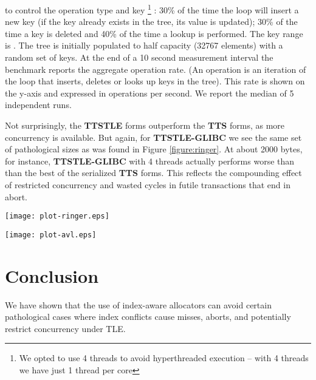 \documentclass[preprint]{sigplanconf}
\begin{document}
to control the operation type and key \footnote{We opted to use 4 threads to
avoid hyperthreaded execution --  with 4 threads we have just 1 thread per core} :
30\% of the time the loop will insert a new key (if the key
already exists in the tree, its value is updated); 30\% of the time a key is deleted
and 40\% of the time a lookup is performed.  The key range is .  The
tree is initially populated to half capacity (32767 elements) with a random set of keys.  At the 
end of a 10 second measurement interval the benchmark reports the aggregate
operation rate.  (An operation is an iteration of the loop that inserts, deletes
or looks up keys in the tree).  This rate is shown on the y-axis and expressed
in operations per second.   We report the median of 5 independent runs.  

Not surprisingly, the \textbf{TTSTLE} forms outperform the \textbf{TTS} forms, 
as more concurrency is available.  But again, for \textbf{TTSTLE-GLIBC} we
see the same set of pathological sizes as was found in Figure \ref{figure:ringer}. 
At about 2000 bytes, for instance, \textbf{TTSTLE-GLIBC} with 4 threads actually
performs worse than than the best of the serialized \textbf{TTS} forms.  
This reflects the compounding effect of restricted concurrency and wasted cycles
in futile transactions that end in abort. 


\begin{figure*}[hbtp]
\begin{center}
\texttt{[image: plot-ringer.eps]}
\end{center}
\caption{Single-threaded ring traversal rates} 
\label{figure:ringer}
\end{figure*}

\begin{figure*}[hbtp]
\begin{center}
\texttt{[image: plot-avl.eps]}
\end{center}
\caption{AVL tree throughput with 4 threads} 
\label{figure:avl} 
\end{figure*}


\section{Conclusion}

We have shown that the use of index-aware allocators can avoid certain
pathological cases where index conflicts cause misses, aborts, and
potentially restrict concurrency under TLE.   
\end{document}
